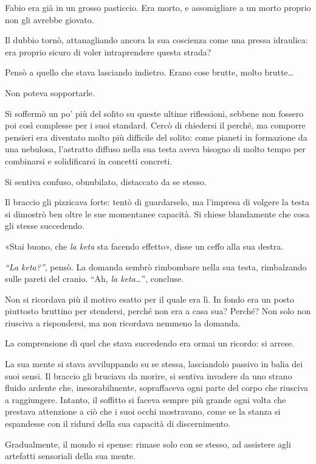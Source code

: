 Fabio era già in un grosso pasticcio. Era morto, e assomigliare a un morto proprio non gli avrebbe giovato.

Il dubbio tornò, attanagliando ancora la sua coscienza come una pressa idraulica: era proprio sicuro di voler intraprendere questa strada?

Pensò a quello che stava lasciando indietro. Erano cose brutte, molto brutte\ldots\ 

Non poteva sopportarle.

Si soffermò un po' più del solito su queste ultime riflessioni, sebbene non fossero poi così complesse per i suoi standard. Cercò di chiedersi il perché, ma comporre pensieri era diventato molto più difficile del solito: come pianeti in formazione da una nebulosa, l'astratto diffuso nella sua testa aveva bisogno di molto tempo per combinarsi e solidificarsi in concetti concreti. 

Si sentiva confuso, obnubilato, distaccato da se stesso. 

Il braccio gli pizzicava forte: tentò di guardarselo, ma l'impresa di volgere la testa si dimostrò ben oltre le sue momentanee capacità. Si chiese blandamente che cosa gli stesse succedendo.

«Stai buono, che \textit{la keta} sta facendo effetto», disse un ceffo alla sua destra.

\textit{``La keta?''}, pensò. La domanda sembrò rimbombare nella sua testa, rimbalzando sulle pareti del cranio. ``Ah, \textit{la keta\ldots}'', concluse. 

Non si ricordava più il motivo esatto per il quale era lì. In fondo era un posto piuttosto bruttino per stendersi, perché non era a casa sua? Perché? Non solo non riusciva a rispondersi, ma non ricordava nemmeno la domanda. 

La comprensione di quel che stava succedendo era ormai un ricordo: si arrese. 

La sua mente si stava avviluppando su se stessa, lasciandolo passivo in balia dei suoi sensi. Il braccio gli bruciava da morire, si sentiva invadere da uno strano fluido ardente che, inesorabilmente, sopraffaceva ogni parte del corpo che riusciva a raggiungere. Intanto, il soffitto si faceva sempre più grande ogni volta che prestava attenzione a ciò che i suoi occhi mostravano, come se la stanza si espandesse con il ridursi della sua capacità di discernimento. 

Gradualmente, il mondo si spense: rimase solo con se stesso, ad assistere agli artefatti sensoriali della sua mente.
